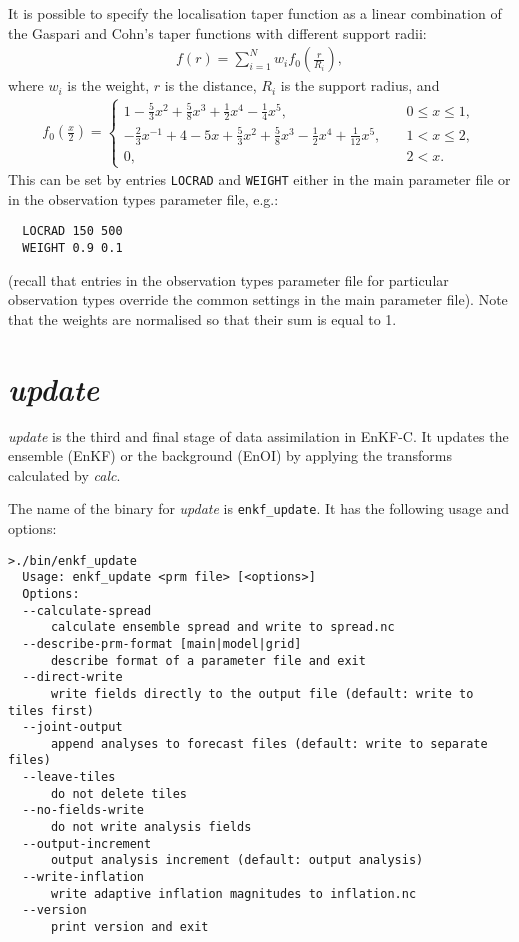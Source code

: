\documentclass[11pt]{report}
\begin{document}
It is possible to specify the localisation taper function as a linear combination of the Gaspari and Cohn's taper functions with different support radii:
\begin{align*}
  f(r) = \sum_{i=1}^N w_i f_0(\frac{r}{R_i}),
\end{align*}
where $w_i$ is the weight, $r$ is the distance, $R_i$ is the support radius, and
\begin{align*}
  f_0(\frac{x}{2}) = \left\{
  \begin{array}{ll}
    1 - \frac{5}{3} x^2 + \frac{5}{8} x^3 + \frac{1}{2} x^4 -\frac{1}{4} x^5, \quad & 0 \le x \le 1,\\
    -\frac{2}{3} x^{-1} + 4 - 5x + \frac{5}{3}x^2 + \frac{5}{8}x^3 - \frac{1}{2} x^4 + \frac{1}{12}x^5, \quad & 1 < x \le 2,\\
    0, \quad & 2 < x.
  \end{array}
  \right.
\end{align*}
This can be set by entries \verb|LOCRAD| and \verb|WEIGHT| either in the main parameter file or in the observation types parameter file, e.g.:
\begin{Verbatim}
  LOCRAD 150 500
  WEIGHT 0.9 0.1
\end{Verbatim}
(recall that entries in the observation types parameter file for particular observation types override the common settings in the main parameter file).
Note that the weights are normalised so that their sum is equal to 1.

\section{\emph{update}}

\emph{update} is the third and final stage of data assimilation in EnKF-C.
It updates the ensemble (EnKF) or the background (EnOI) by applying the transforms calculated by \emph{calc}.

The name of the binary for \emph{update} is \verb|enkf_update|.
It has the following usage and options:
\begin{Verbatim}[frame=single,fontsize=\footnotesize]
>./bin/enkf_update
  Usage: enkf_update <prm file> [<options>]
  Options:
  --calculate-spread
      calculate ensemble spread and write to spread.nc
  --describe-prm-format [main|model|grid]
      describe format of a parameter file and exit
  --direct-write
      write fields directly to the output file (default: write to tiles first)
  --joint-output
      append analyses to forecast files (default: write to separate files)
  --leave-tiles
      do not delete tiles
  --no-fields-write
      do not write analysis fields
  --output-increment
      output analysis increment (default: output analysis)
  --write-inflation
      write adaptive inflation magnitudes to inflation.nc
  --version
      print version and exit
\end{Verbatim}
\end{document}
